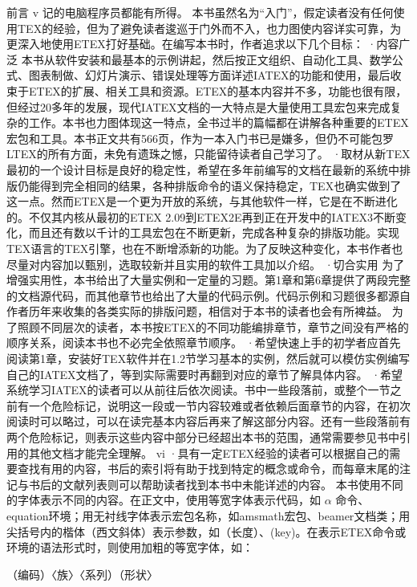 \documentclass[UTF8]{ctexart}
\begin{document}
前言	v
记的电脑程序员都能有所得。
本书虽然名为“入门”，假定读者没有任何使用TEX的经验，但为了避免读者逡巡于门外而不入，也力图使内容详实可靠，为更深入地使用ETEX打好基础。在编写本书时，作者追求以下几个目标：
·内容广泛	本书从软件安装和最基本的示例讲起，然后按正文组织、自动化工具、数学公式、图表制做、幻灯片演示、错误处理等方面详述IATEX的功能和使用，最后收束于ETEX的扩展、相关工具和资源。ETEX的基本内容并不多，功能也很有限，但经过20多年的发展，现代IATEX文档的一大特点是大量使用工具宏包来完成复杂的工作。本书也力图体现这一特点，全书过半的篇幅都在讲解各种重要的ETEX宏包和工具。本书正文共有566页，作为一本入门书已是嫌多，但仍不可能包罗LTEX的所有方面，未免有遗珠之憾，只能留待读者自己学习了。
·取材从新TEX最初的一个设计目标是良好的稳定性，希望在多年前编写的文档在最新的系统中排版仍能得到完全相同的结果，各种排版命令的语义保持稳定，TEX也确实做到了这一点。然而ETEX是一个更为开放的系统，与其他软件一样，它是在不断进化的。不仅其内核从最初的ETEX 2.09到ETEX2E再到正在开发中的IATEX3不断变化，而且还有数以千计的工具宏包在不断更新，完成各种复杂的排版功能。实现TEX语言的TEX引擎，也在不断增添新的功能。为了反映这种变化，本书作者也尽量对内容加以甄别，选取较新并且实用的软件工具加以介绍。
·切合实用	为了增强实用性，本书给出了大量实例和一定量的习题。第1章和第6章提供了两段完整的文档源代码，而其他章节也给出了大量的代码示例。代码示例和习题很多都源自作者历年来收集的各类实际的排版问题，相信对于本书的读者也会有所裨益。
为了照顾不同层次的读者，本书按ETEX的不同功能编排章节，章节之间没有严格的顺序关系，阅读本书也不必完全依照章节顺序。
·希望快速上手的初学者应首先阅读第1章，安装好TEX软件并在1.2节学习基本的实例，然后就可以模仿实例编写自己的IATEX文档了，等到实际需要时再翻到对应的章节了解具体内容。
·希望系统学习IATEX的读者可以从前往后依次阅读。书中一些段落前，或整个一节之前有一个危险标记，说明这一段或一节内容较难或者依赖后面章节的内容，在初次阅读时可以略过，可以在读完基本内容后再来了解这部分内容。还有一些段落前有两个危险标记，则表示这些内容中部分已经超出本书的范围，通常需要参见书中引用的其他文档才能完全理解。
vi
·具有一定ETEX经验的读者可以根据自己的需要查找有用的内容，书后的索引将有助于找到特定的概念或命令，而每章末尾的注记与书后的文献列表则可以帮助读者找到本书中未能详述的内容。
本书使用不同的字体表示不同的内容。在正文中，使用等宽字体表示代码，如 $\alpha$ 命令、equation环境；用无衬线字体表示宏包名称，如amsmath宏包、beamer文档类；用尖括号内的楷体（西文斜体）表示参数，如（长度）、(key)。在表示ETEX命令或环境的语法形式时，则使用加粗的等宽字体，如：

（编码）〈族〉〈系列）（形状〉
\end{document}
